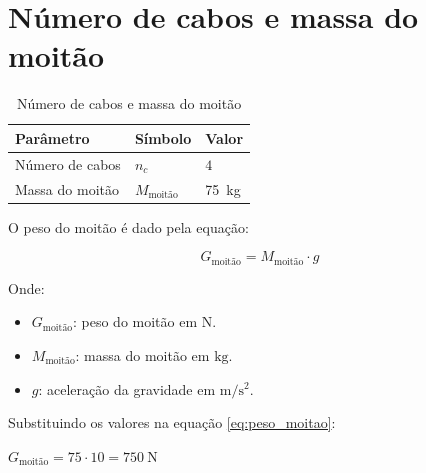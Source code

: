 \section{Número de cabos e massa do moitão}

\begin{table}[H]
  \centering
  \caption{Número de cabos e massa do moitão}
  \begin{tabularx}{\textwidth}{>{\centering\arraybackslash}X>{\centering\arraybackslash}X>{\centering\arraybackslash}X}
    \toprule
    Parâmetro       & Símbolo             & Valor               \\
    \midrule
    Número de cabos & $n_c$               & $4$                 \\
    Massa do moitão & $M_{\text{moitão}}$ & \SI{75}{\kilo\gram} \\
    \bottomrule
  \end{tabularx}
\end{table}

O peso do moitão é dado pela equação:

\begin{equation}
  G_{\text{moitão}} = M_{\text{moitão}} \cdot g
  \label{eq:peso_moitao}
\end{equation}

\noindent Onde:
\begin{itemize}[leftmargin=1.25cm]
  \item $G_{\text{moitão}}$: peso do moitão em $\si{\newton}$.
  \item $M_{\text{moitão}}$: massa do moitão em $\si{\kilo\gram}$.
  \item $g$: aceleração da gravidade em $\si{\meter/\second^2}$.
\end{itemize}

\vspace{1em}

\noindent Substituindo os valores na equação \eqref{eq:peso_moitao}:

\noindent $G_{\text{moitão}} = 75 \cdot 10 = \SI{750}{\newton}$
